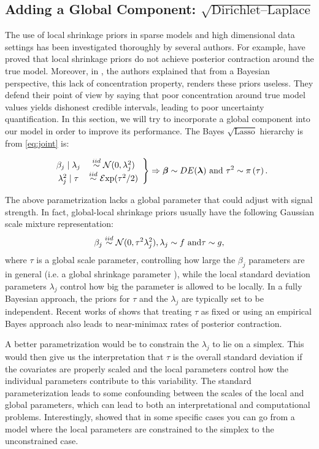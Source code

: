 \documentclass[10pt]{article}
\def\sql{$\sqrt{\text{Lasso}}$}
\begin{document}
\subsection{Adding a Global Component: $ \sqrt{\text{Dirichlet--Laplace}}$}

The use of local shrinkage priors in sparse models and high dimensional data settings has been investigated thoroughly by several authors. For example, \citep{castillo2015bayesian} have proved that local shrinkage priors do not achieve posterior contraction around the true model. Moreover, in \cite{castillo2015bayesian}, the authors explained that from a Bayesian perspective, this lack of concentration property, renders these priors useless. They defend their point of view by saying that poor concentration around true model values yields dishonest credible intervals, leading to poor uncertainty quantification. In this section, we will try to incorporate a global component into our model in order to improve its performance. The Bayes \sql{} hierarchy is from \eqref{eq:joint} is:

\begin{equation} \label{Lasso_prior}
\left.
\begin{array}{cc}
\beta_j \mid \lambda_j & \stackrel{iid}{\sim} \mathcal{N}(0 , \lambda_j^2) \\
\lambda_j^2 \mid \tau & \stackrel{iid}{\sim} \mathcal{E}\mathrm{xp}(\tau^2/2) 
\end{array} \right \} \Rightarrow
\boldsymbol{\beta} \sim DE(\boldsymbol{\lambda}) \text{ and } \tau^2 \sim \pi\left(\tau \right). 
\end{equation}

The above parametrization lacks a global parameter that could adjust with signal strength. In fact, global-local shrinkage priors usually have the following Gaussian scale mixture representation: \[ \beta_j \stackrel{iid}{\sim} \mathcal{N}(0 , \tau^2 \lambda_j^2), \lambda_j \sim f \mbox{ and}  \tau \sim g, \] where $\tau$ is a global scale parameter, controlling how large the $\beta_j$ parameters are in general (\rm{i.e.} a global shrinkage parameter ), while the local standard deviation parameters $\lambda_j$ control how big the parameter is allowed to be locally.  In a fully Bayesian approach, the priors for $\tau$ and the $\lambda_j$ are typically set to be independent.  Recent works of \citet{van2017adaptive} shows that treating $\tau$ as fixed or using an empirical Bayes approach also leads to near-minimax rates of posterior contraction. 

A better parametrization would be to constrain the $\lambda_j$ to lie on a simplex.  This would then give us the interpretation that $\tau$ is the overall standard deviation if the covariates are properly scaled  and the local parameters control how the individual parameters contribute to this variability. The standard parameterization leads to some confounding between the scales of the local and global parameters, which can lead to both an interpretational and computational problems.  Interestingly, \citet{bhattacharya2014dirichlet} showed that in some specific cases you can go from a model where the local parameters are constrained to the simplex to the unconstrained case.
\end{document}
